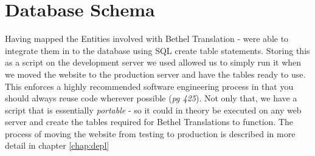 \documentclass{l3proj}
\begin{document}
\section{Database Schema} \label{sect:db-sch} Having mapped the Entities
involved with Bethel Translation -  were able to integrate them in to the
database using SQL create table statements. Storing this as a script on the
development server we used allowed us to simply run it when we moved the
website to the production server and have the tables ready to use.  This
enforces a highly recommended software engineering process in that you should
always reuse code wherever possible \cite{seng} (\textit{pg 425}). Not only that, we have a script that is essentially
\textit{portable} - so it could in theory be executed on any web server and
create the tables required for Bethel Translations to function. The process of
moving the website from testing to production is described in more detail in
chapter \ref{chap:depl}  \\
\\
\end{document}
